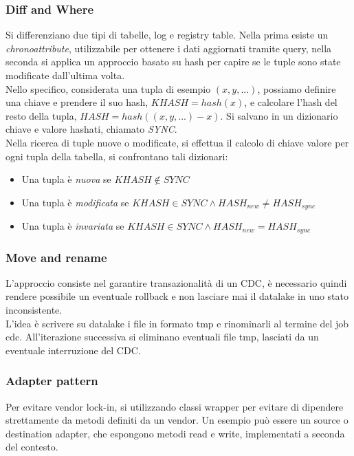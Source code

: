 \subsubsection{Diff and Where}
Si differenziano due tipi di tabelle, log e registry table.
Nella prima esiste un \emph{chronoattribute}, utilizzabile per ottenere i dati aggiornati 
tramite query, nella seconda si applica un approccio basato su hash per capire 
se le tuple sono state modificate dall'ultima volta.\\
Nello specifico, considerata una tupla di esempio $(x,y,...)$, possiamo definire una chiave
e prendere il suo hash, $KHASH = hash(x)$, e calcolare l'hash del resto della tupla, 
$HASH = hash((x,y,...) - x)$. Si salvano in un dizionario chiave e valore hashati, chiamato
\emph{SYNC}.\\
Nella ricerca di tuple nuove o modificate, si effettua il calcolo di chiave valore 
per ogni tupla della tabella, si confrontano tali dizionari:
\begin{itemize}
    \item Una tupla è \emph{nuova} se $KHASH \notin SYNC$
    \item Una tupla è \emph{modificata} se $KHASH \in SYNC \wedge  HASH_{new} \neq HASH_{sync}$
    \item Una tupla è \emph{invariata} se $KHASH \in SYNC \wedge HASH_{new} = HASH_{sync}$
\end{itemize}


\subsubsection{Move and rename}
L'approccio consiste nel garantire transazionalità di un CDC, 
è necessario quindi rendere possibile un eventuale rollback e non lasciare mai 
il datalake in uno stato inconsistente.\\
L'idea è scrivere su datalake i file in formato tmp e rinominarli al termine del job cdc.
All'iterazione successiva si eliminano eventuali file tmp, lasciati da un eventuale 
interruzione del CDC.

\subsubsection{Adapter pattern}
Per evitare vendor lock-in, si utilizzando classi wrapper per evitare di dipendere
strettamente da metodi definiti da un vendor.
Un esempio può essere un source o destination adapter, che espongono metodi read e 
write, implementati a seconda del contesto.

